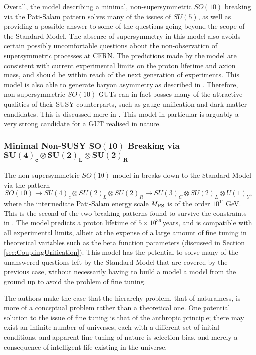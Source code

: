 \documentclass{article}
\begin{document}
Overall, the model describing a minimal, non-supersymmetric $SO(10)$ breaking via the Pati-Salam pattern solves many of the issues of $SU(5)$, as well as providing a possible answer to some of the questions going beyond the scope of the Standard Model. The absence of supersymmetry in this model also avoids certain possibly uncomfortable questions about the non-observation of supersymmetric processes at CERN. The predictions made by the model are consistent with current experimental limits on the proton lifetime and axion mass, and should be within reach of the next generation of experiments. This model is also able to generate baryon asymmetry as described in \cite{SO10BaryonAsym}.
Therefore, non-supersymmetric $SO(10)$ GUTs can in fact posses many of the attractive qualities  of their SUSY counterparts, such as gauge unification and dark matter candidates. This is discussed more in \cite{SO10_UnificationDM}. This model in particular is arguably a very strong candidate for a GUT realised in nature.


\subsubsection{Minimal Non-SUSY $\bm{SO(10)}$ Breaking via $\bm{SU(4)_c \otimes SU(2)_L \otimes SU(2)_R}$}
\label{sec:GUT_SO10_2}
The non-supersymmetric $SO(10)$ model in \cite{SO10_2} breaks down to the Standard Model via the pattern
\begin{equation}
SO(10)\rightarrow SU(4)_c \otimes SU(2)_L \otimes SU(2)_R  \rightarrow SU(3)_C\otimes SU(2)_L \otimes U(1)_Y,
\end{equation}
where the intermediate Pati-Salam energy scale $M_{\rm{PS}}$ is of the order $10^{11}\,$GeV. This is the second of the two breaking patterns found to survive the constraints in \cite{SO10_UnificationDM}. The model predicts a proton lifetime of $5\times10^{36}\,$years, and is compatible with all experimental limits, albeit at the expense of a large amount of fine tuning in theoretical variables such as the beta function parameters (discussed in Section \ref{sec:CouplingUnification}). This model has the potential to solve many of the unanswered questions left by the Standard Model that are covered by the previous case, without necessarily having to build a model a model from the ground up to avoid the problem of fine tuning.

The authors make the case that the hierarchy problem, that of naturalness, is more of a conceptual problem rather than a theoretical one. One potential solution to the issue of fine tuning is that of the anthropic principle; there may exist an infinite number of universes, each with a different set of initial conditions, and apparent fine tuning of nature is selection bias, and merely a consequence of intelligent life existing in the universe. 
\end{document}
